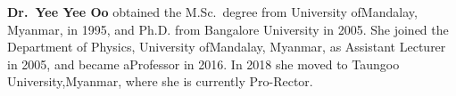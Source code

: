 \noindent
\textbf{Dr.\ Yee Yee Oo} obtained the M.Sc.\ degree from University of\break Mandalay, Myanmar, in 1995, and Ph.D. from Bangalore University in 2005. She joined the Department of Physics, University of\break Mandalay, Myanmar, as Assistant Lecturer in 2005, and became a\break Professor in 2016. In 2018 she moved to Taungoo University,\break Myanmar, where she is currently Pro-Rector.
